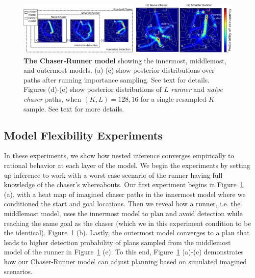 \documentclass[twoside]{article}
\begin{document}
\begin{figure}
\begin{center}
\centerline{\includegraphics[width=2.0\columnwidth]{occupancy_diagram.eps}}
\caption{ \textbf{The Chaser-Runner model} showing the innermost, middlemost, and outermost models. (a)-(c) show posterior distributions over paths after running importance sampling. See text for details. Figures (d)-(e) show posterior distributions of $L$ \textit{runner} and \textit{naive chaser} paths, when $(K,L) = 128, 16$ for a single resampled $K$ sample. See text for more details. 
}
\label{fig:progression}
\end{center}
\end{figure} 


\subsection{Model Flexibility Experiments}

In these experiments, we show how nested inference converges empirically to rational behavior at each layer of the model. We begin the experiments by setting up inference to work with a worst case scenario of the runner having full knowledge of the chaser's whereabouts. %
Our first experiment begins in Figure~\ref{fig:progression} (a), with a heat map of imagined chaser paths in the innermost model where we conditioned the start and goal locations. Then we reveal how a runner, i.e. the middlemost model, uses the innermost model to plan and avoid detection while reaching the same goal as the chaser (which we in this experiment condition to be the identical), Figure~\ref{fig:progression} (b). Lastly, the outermost model converges to a plan that leads to higher detection probability of plans sampled from the middlemost model of the runner in Figure~\ref{fig:progression} (c). To this end, Figure~\ref{fig:progression} (a)-(c) demonstrates how our Chaser-Runner model can adjust planning based on simulated imagined scenarios. 
\end{document}
